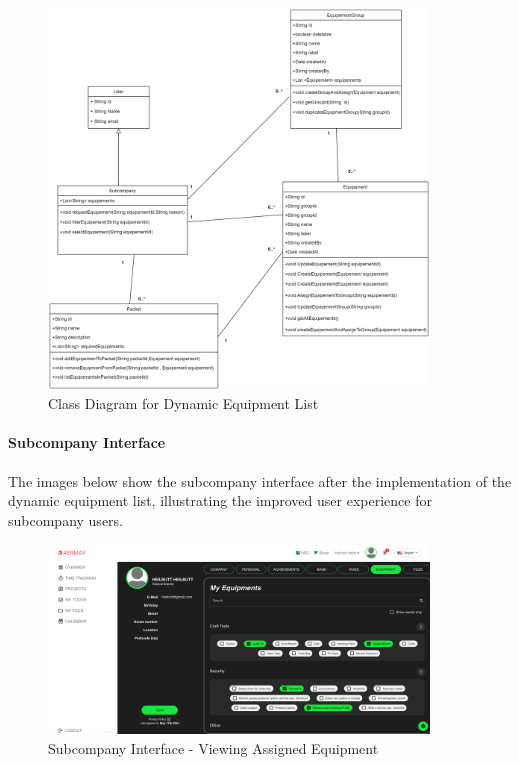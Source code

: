 \begin{figure}[H]
    \centering
    \includegraphics[width=0.9\textwidth]{src/assets/diagrams/DynamiEquipementList.png}
    \caption{Class Diagram for Dynamic Equipment List}
    \label{fig:class_diagram}
\end{figure}
 

\paragraph{Subcompany Interface}
The images below show the subcompany interface after the implementation of the dynamic equipment list, illustrating the improved user experience for subcompany users.

\begin{figure}[H]
    \centering
    \includegraphics[width=0.9\textwidth]{src/assets/images/Interface1.png}
    \caption{Subcompany Interface - Viewing Assigned Equipment}
    \label{fig:subcompany_interface_1}
\end{figure}

